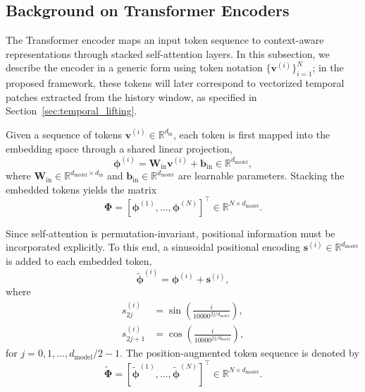\documentclass[journal]{IEEEtran}
\newcommand{\vs}{\mathbf{s}}
\newcommand{\vb}{\mathbf{b}}
\newcommand{\vphi}{\boldsymbol{\phi}}
\newcommand{\mW}{\mathbf{W}}
\newcommand{\mPhi}{\boldsymbol{\Phi}}
\begin{document}
\subsection{Background on Transformer Encoders}
\label{sec:transformer_background}

The Transformer encoder \cite{vaswani2017attention} maps an input token sequence to context-aware representations through stacked self-attention layers. In this subsection, we describe the encoder in a generic form using token notation $\{\mathbf{v}^{(i)}\}_{i=1}^{N}$; in the proposed framework, these tokens will later correspond to vectorized temporal patches extracted from the history window, as specified in Section~\ref{sec:temporal_lifting}.

Given a sequence of tokens $\mathbf{v}^{(i)} \in \mathbb{R}^{d_{\mathrm{in}}}$, each token is first mapped into the embedding space through a shared linear projection,
\begin{equation}
    \vphi^{(i)} = \mW_{\mathrm{in}} \mathbf{v}^{(i)} + \vb_{\mathrm{in}}
    \in \mathbb{R}^{d_{\mathrm{model}}},
    \label{eq:general_embed}
\end{equation}
where $\mW_{\mathrm{in}} \in \mathbb{R}^{d_{\mathrm{model}} \times d_{\mathrm{in}}}$ and $\vb_{\mathrm{in}} \in \mathbb{R}^{d_{\mathrm{model}}}$ are learnable parameters. Stacking the embedded tokens yields the matrix
\begin{equation}
    \mPhi = [\vphi^{(1)}, \ldots, \vphi^{(N)}]^\top
    \in \mathbb{R}^{N \times d_{\mathrm{model}}}.
\end{equation}

Since self-attention is permutation-invariant, positional information must be incorporated explicitly. To this end, a sinusoidal positional encoding $\vs^{(i)} \in \mathbb{R}^{d_{\mathrm{model}}}$ is added to each embedded token,
\begin{equation}
    \tilde{\vphi}^{(i)} = \vphi^{(i)} + \vs^{(i)},
\end{equation}
where
\begin{equation}
\begin{split}
    s^{(i)}_{2j} &= \sin\!\left(\frac{i}{10000^{2j/d_{\mathrm{model}}}}\right), \\
    s^{(i)}_{2j+1} &= \cos\!\left(\frac{i}{10000^{2j/d_{\mathrm{model}}}}\right),
\end{split}
\label{eq:pos_enc}
\end{equation}
for $j = 0,1,\ldots,d_{\mathrm{model}}/2-1$. The position-augmented token sequence is denoted by
\begin{equation}
    \widetilde{\mPhi}
    =
    [\tilde{\vphi}^{(1)}, \ldots, \tilde{\vphi}^{(N)}]^\top
    \in \mathbb{R}^{N \times d_{\mathrm{model}}}.
\end{equation}
\end{document}
